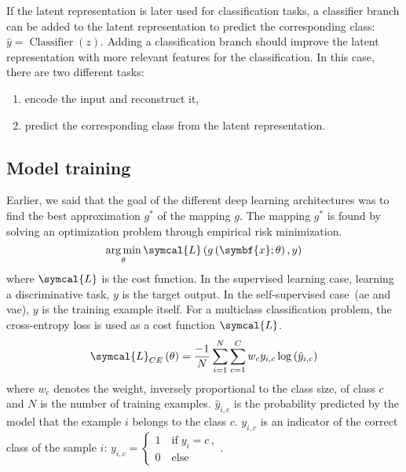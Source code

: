 \documentclass[../main.tex]{subfiles}
\begin{document}
     If the latent representation is later used for classification tasks, a classifier branch can be added to the latent representation to predict the corresponding class: \(\hat{y} = \operatorname{Classifier}\left(z\right)\).
     Adding a classification branch should improve the latent representation with more relevant features for the classification.
     In this case, there are two different tasks:
     \begin{enumerate}[nosep]
         \item encode the input and reconstruct it,
         \item predict the corresponding class from the latent representation.
     \end{enumerate}

 \subsection{}

 \subsection{Model training}
     Earlier, we said that the goal of the different deep learning architectures was to find the best approximation \(g^{*}\) of the mapping \(g\).
     The mapping \(g^{*}\) is found by solving an optimization problem through empirical risk minimization.
     \begin{equation}
         \argmin_{\theta} \symcal{L}\left(g\left(\symbf{x}; \theta\right), y\right) \label{eq:dl_opt}
     \end{equation}
     where \(\symcal{L}\) is the cost function.
     In the supervised learning case, learning a discriminative task, \(y\) is the target output.
     In the self-supervised case~(\gls{ae} and \gls{vae}), \(y\) is the training example itself.
     For a multiclass classification problem, the cross-entropy loss is used as a cost function \(\symcal{L}\).
     \begin{equation}
         \symcal{L}_{CE}\left(\theta\right) = \frac{-1}{N}\sum_{i=1}^{N}\sum_{c=1}^{C} w_c y_{i,c}\log\left(\hat{y}_{i,c}\right)
     \end{equation}
     where \(w_c\) denotes the weight, inversely proportional to the class size, of class \(c\) and \(N\) is the number of training examples.
     \(\hat{y}_{i,c}\) is the probability predicted by the model that the example \(i\) belongs to the class \(c\).
     \(y_{i,c}\) is an indicator of the correct class of the sample \(i\):
     \(
     y_{i,c} = \begin{cases}
         1 \quad \text{if}\; y_i = c \, , \\
         0 \quad \text{else}
     \end{cases}
     \).
\end{document}
